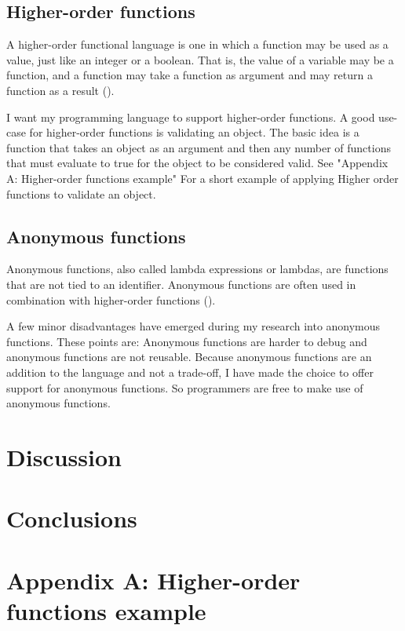 \documentclass{uva-inf-article}
\begin{document}
\newpage
\subsection{Higher-order functions}
\par A higher-order functional language is one in which a function may be used as a value, 
just like an integer or a boolean. That is, the value of a variable may be a function, 
and a function may take a function as argument and may return a function as a result
(\cite{Sestoft2012}).
\vspace{5mm}

\par I want my programming language to support higher-order functions.
A good use-case for higher-order functions is validating an object.
The basic idea is a function that takes an object as an argument and then any number of 
functions that must evaluate to true for the object to be considered valid.
See "Appendix A: Higher-order functions example" For a short example of applying 
Higher order functions to validate an object.

\subsection{Anonymous functions}
\par Anonymous functions, also called lambda expressions or lambdas, are functions that are not tied to an identifier.
Anonymous functions are often used in combination with higher-order functions (\cite{HigherOrder}).
\vspace{5mm}

\par A few minor disadvantages have emerged during my research into anonymous functions. 
These points are:
Anonymous functions are harder to debug and anonymous functions are not reusable. 
Because anonymous functions are an addition to the language and not a trade-off, 
I have made the choice to offer support for anonymous functions. 
So programmers are free to make use of anonymous functions.

\section{Discussion}

\section{Conclusions}


\printbibliography

\newpage
\section{Appendix A: Higher-order functions example}

\end{document}
